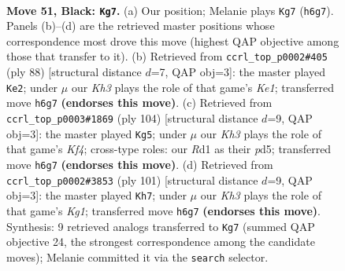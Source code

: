 \documentclass[11pt]{article}
\begin{document}
\clearpage

\begin{figure}[p]\centering
\begin{subfigure}{0.46\textwidth}\centering
\resizebox{\linewidth}{!}{%
\newchessgame
\chessboard[
  setfen={8/p2p4/2p4k/5P2/5K2/8/8/3r4 b - - 4 51},
  showmover=false,
  pgfstyle=straightmove, color=movearrow, markmove={h6-g7}
]}
\caption{}
\end{subfigure}\hfill
\begin{subfigure}{0.46\textwidth}\centering
\resizebox{\linewidth}{!}{%
\newchessgame
\chessboard[
  setfen={1r6/5pk1/8/5p2/5P2/R5P1/8/4K3 w - - 3 45},
  showmover=false,
  pgfstyle=straightmove, color=movearrow, markmove={e1-e2}
]}
\caption{}
\end{subfigure}
\\[4pt]
\begin{subfigure}{0.46\textwidth}\centering
\resizebox{\linewidth}{!}{%
\newchessgame
\chessboard[
  setfen={8/5pk1/8/3pP3/3P1K2/8/8/8 w - - 2 53},
  showmover=false,
  pgfstyle=straightmove, color=movearrow, markmove={f4-g5}
]}
\caption{}
\end{subfigure}\hfill
\begin{subfigure}{0.46\textwidth}\centering
\resizebox{\linewidth}{!}{%
\newchessgame
\chessboard[
  setfen={6k1/5p2/6p1/8/8/6PP/5K2/8 b - - 0 51},
  showmover=false,
  pgfstyle=straightmove, color=movearrow, markmove={g8-h7}
]}
\caption{}
\end{subfigure}
\caption{\textbf{Move 51, Black: \texttt{Kg7}.} (a) Our position; Melanie plays \texttt{Kg7} (\texttt{h6g7}). Panels (b)--(d) are the retrieved master positions whose correspondence most drove this move (highest QAP objective among those that transfer to it). (b) Retrieved from \texttt{ccrl\_top\_p0002\#405} (ply 88) [structural distance $d$=7, QAP obj=3]: the master played \texttt{Ke2}; under $\mu$ our \emph{Kh3} plays the role of that game's \emph{Ke1}; transferred move \texttt{h6g7} \textbf{(endorses this move)}. (c) Retrieved from \texttt{ccrl\_top\_p0003\#1869} (ply 104) [structural distance $d$=9, QAP obj=3]: the master played \texttt{Kg5}; under $\mu$ our \emph{Kh3} plays the role of that game's \emph{Kf4}; cross-type roles: our \emph{R}d1 as their \emph{p}d5; transferred move \texttt{h6g7} \textbf{(endorses this move)}. (d) Retrieved from \texttt{ccrl\_top\_p0002\#3853} (ply 101) [structural distance $d$=9, QAP obj=3]: the master played \texttt{Kh7}; under $\mu$ our \emph{Kh3} plays the role of that game's \emph{Kg1}; transferred move \texttt{h6g7} \textbf{(endorses this move)}. Synthesis: 9 retrieved analogs transferred to \texttt{Kg7} (summed QAP objective 24, the strongest correspondence among the candidate moves); Melanie committed it via the \texttt{search} selector.}
\label{fig:thought-m101}
\end{figure}
\end{document}
